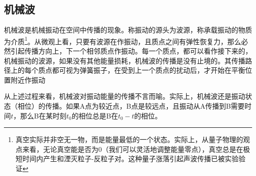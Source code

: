 
\subsection{机械波}
机械波是机械振动在空间中传播的现象。称振动的源头为波源，称承载振动的物质为介质\footnote{真空实际并非空无一物，而是能量最低的一个状态。实际上，从量子物理的观点来看，无论真空能是否为0（我们可以灵活地调整能量零点），真空总是在极短时间内产生和湮灭粒子-反粒子对。这种量子涨落引起声波传播已被实验验证}。从微观上看，只要有波源在作振动，且质点之间有弹性恢复力，那么必然引起传播方向上，下一个相邻质点作振动。每一个质点，都可以看作接下来的，机械振动的波源，如果没有其他能量损耗，机械波的传播是没有止境的。其传播路径上的每个质点都可视为弹簧振子，在受到上一个质点的扰动后，才开始在平衡位置附近作振动

从上述过程来看，机械波对振动能量的传播不言而喻。实际上，机械波还是振动状态（相位）的传播。如果A点为较近点，B点是较远点，且振动从A传播到B需要时间$t$，那么B在某时刻$t_0$的相位总是B在$t_0-t$的相位。
